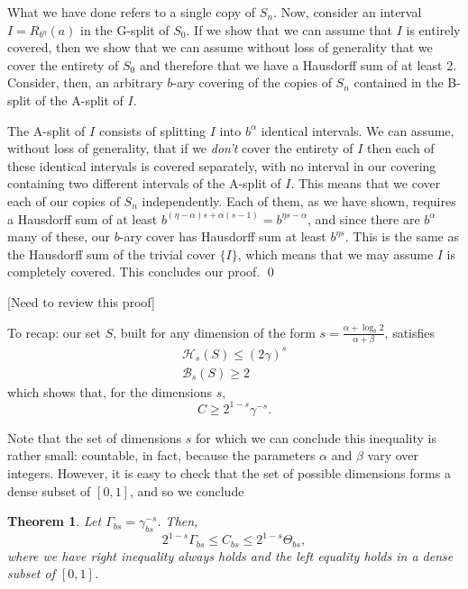 \documentclass[11pt, reqno]{amsart}
\newcommand{\HH}{\mathcal{H}}
\newcommand{\BB}{\mathcal{B}}
\newtheorem{theorem}{Theorem}
\begin{document}
What we have done refers to a single copy of $S_n$. Now, consider an interval $I = R_{b^\eta}(a)$ in the G-split of $S_0$. If we show that we can assume that $I$ is entirely covered, then we show that we can assume without loss of generality that we cover the entirety of $S_0$ and therefore that we have a Hausdorff sum of at least 2. Consider, then, an arbitrary $b$-ary covering of the copies of $S_n$ contained in the B-split of the A-split of $I$.

The A-split of $I$ consists of splitting $I$ into $b^\alpha$ identical intervals. We can assume, without loss of generality, that if we \emph{don't} cover the entirety of $I$ then each of these identical intervals is covered separately, with no interval in our covering containing two different intervals of the A-split of $I$. This means that we cover each of our copies of $S_n$ independently. Each of them, as we have shown, requires a Hausdorff sum of at least $b^{(\eta - \alpha)s + \alpha(s - 1)} = b^{\eta s - \alpha}$, and since there are $b^\alpha$ many of these, our $b$-ary cover has Hausdorff sum at least $b^{\eta s}$. This is the same as the Hausdorff sum of the trivial cover $\{I\}$, which means that we may assume $I$ is completely covered. This concludes our proof. \qed

[Need to review this proof]

To recap: our set $S$, built for any dimension of the form $s = \frac{\alpha + \log_b 2}{\alpha + \beta}$, satisfies
\begin{gather*}
\HH_s(S) \leq (2\gamma)^s\\
\BB_s(S) \geq 2
\end{gather*}
which shows that, for the dimensions $s$,
\[C \geq 2^{1-s} \gamma^{-s}.\]

Note that the set of dimensions $s$ for which we can conclude this inequality is rather small: countable, in fact, because the parameters $\alpha$ and $\beta$ vary over integers. However, it is easy to check that the set of possible dimensions forms a dense subset of $[0,1]$, and so we conclude

\begin{theorem}\label{boundtheorem}
Let $\Gamma_{bs} = \gamma_{bs}^{-s}$. Then,
\begin{equation} \label{partialineq}
2^{1-s} \Gamma_{bs} \leq C_{bs} \leq 2^{1-s} \Theta_{bs},
\end{equation}
where we have right inequality always holds and the left equality holds in a dense subset of $\left[0, 1 \right]$.
\end{theorem}
\end{document}
